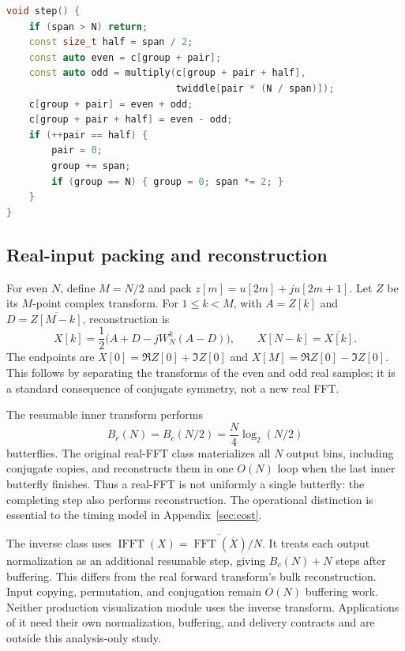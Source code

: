 \begin{lstlisting}[float=tbp,language=C++,caption={Simplified state transition corresponding to the original complex FFT. Tables and storage are prepared separately.},label={lst:step}]
void step() {
    if (span > N) return;
    const size_t half = span / 2;
    const auto even = c[group + pair];
    const auto odd = multiply(c[group + pair + half],
                              twiddle[pair * (N / span)]);
    c[group + pair] = even + odd;
    c[group + pair + half] = even - odd;
    if (++pair == half) {
        pair = 0;
        group += span;
        if (group == N) { group = 0; span *= 2; }
    }
}
\end{lstlisting}

\subsection{Real-input packing and reconstruction}
For even $N$, define $M=N/2$ and pack
$z[m]=u[2m]+j u[2m+1]$. Let $Z$ be its $M$-point complex transform.
For $1\le k<M$, with
$A=Z[k]$ and $D=\overline{Z[M-k]}$, reconstruction is
\begin{equation}
 X[k]=\frac{1}{2}\bigl(A+D-jW_N^k(A-D)\bigr),\qquad
 X[N-k]=\overline{X[k]}.
 \label{eq:real}
\end{equation}
The endpoints are
$X[0]=\Re Z[0]+\Im Z[0]$ and
$X[M]=\Re Z[0]-\Im Z[0]$.
This follows by separating the transforms of the even and odd real samples;
it is a standard consequence of conjugate symmetry, not a new real FFT.

The resumable inner transform performs
\begin{equation}
 B_r(N)=B_c(N/2)=\frac{N}{4}\log_2(N/2)
 \label{eq:countreal}
\end{equation}
butterflies. The original real-FFT class materializes all $N$ output bins, including conjugate
copies, and reconstructs them in one $O(N)$ loop when the last inner butterfly
finishes. Thus a real-FFT  is not uniformly a single butterfly:
the completing step also performs reconstruction. The operational distinction
is essential to the timing model in Appendix~\ref{sec:cost}.

The inverse class uses
$\operatorname{IFFT}(X)=\overline{\operatorname{FFT}(\overline X)}/N$.
It treats each output normalization as an additional resumable step, giving
$B_c(N)+N$ steps after buffering. This differs from the real forward transform's
bulk reconstruction. Input copying, permutation, and conjugation remain
$O(N)$ buffering work. Neither production visualization module uses the
inverse transform. Applications of it need their own normalization,
buffering, and delivery contracts and are outside this analysis-only study.
